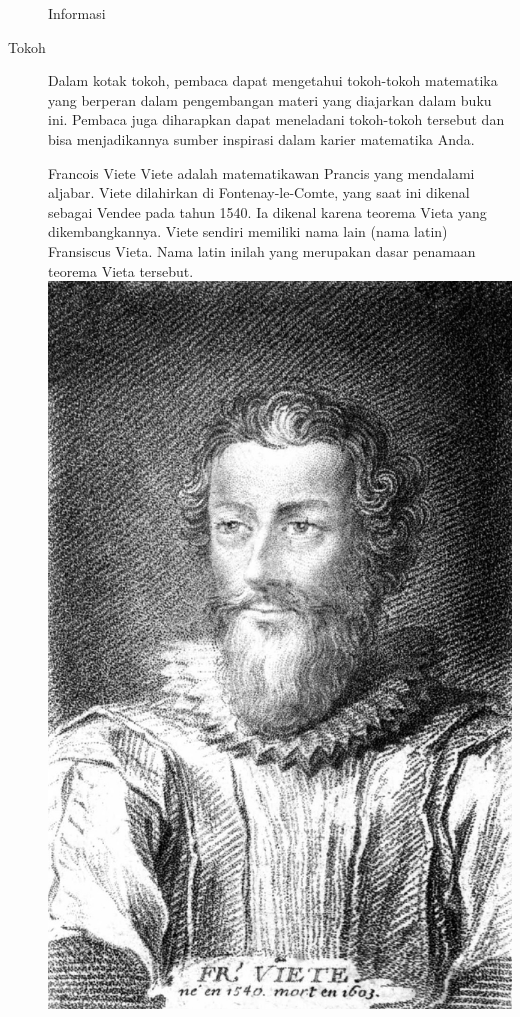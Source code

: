 \begin{description}
\begin{infobox}{Informasi}
	\end{infobox}
	\item[Tokoh] Dalam kotak tokoh, pembaca dapat mengetahui tokoh-tokoh matematika yang berperan dalam pengembangan materi yang diajarkan dalam buku ini. Pembaca juga diharapkan dapat meneladani tokoh-tokoh tersebut dan bisa menjadikannya sumber inspirasi dalam karier matematika Anda.
	\begin{charbox}{Francois Viete}
		Viete adalah matematikawan Prancis yang mendalami aljabar. Viete dilahirkan di Fontenay-le-Comte, yang saat ini dikenal sebagai Vendee pada tahun 1540. Ia dikenal karena teorema Vieta yang dikembangkannya. Viete sendiri memiliki nama lain (nama latin) Fransiscus Vieta. Nama latin inilah yang merupakan dasar penamaan teorema Vieta tersebut.
		\tcblower
		\includegraphics[width=\linewidth]{src/viete}

\end{charbox}
\end{description}
